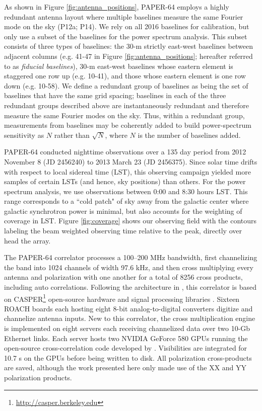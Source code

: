 \documentclass[twocolumn,numberedappendix]{emulateapj} \shorttitle{PSA64}
\begin{document}
As shown in Figure \ref{fig:antenna_positions}, PAPER-64 employs
a highly redundant antenna layout where multiple baselines measure
the same Fourier mode on the sky (P12a; P14).
We rely on all 2016 baselines for calibration,
but only use a subset of the baselines for the power spectrum
analysis. This subset consists of three types of baselines: the 30-m
strictly east-west baselines between adjacent columns (e.g. 41-47
in Figure \ref{fig:antenna_positions}; hereafter referred to 
as {\it fiducial baselines}), 30-m east-west baselines
whose eastern element is staggered one row up (e.g. 10-41), and
those whose eastern element is one row down (e.g. 10-58).
We define a redundant group of
baselines as being the set of baselines that have the same grid spacing;
baselines in each
of the three redundant groups described above are instantaneously redundant and
therefore measure the same Fourier modes on the sky. Thus, within a redundant group,
measurements from baselines may be 
coherently added to build power-spectrum sensitivity as $N$ rather than
$\sqrt{N}$, where $N$ is the number of baselines added.  

PAPER-64 conducted nighttime observations over a 135 day period 
from 2012 November 8 (JD 2456240) to 2013 March 23 (JD 2456375). 
Since solar time drifts with respect to local sidereal time (LST), this observing campaign
yielded more samples of certain LSTs (and hence, sky positions) than others. 
For the power spectrum analysis, we use observations between 0:00 and 8:30 hours
LST.  This range corresponds to
a ``cold patch" of sky away from the galactic center where galactic synchrotron power is minimal,
but also accounts for the weighting of coverage in LST.
Figure \ref{fig:coverage} shows our observing field with the contours labeling
the beam weighted observing time relative to the peak, directly over head the
array.

The PAPER-64 correlator processes a 100--200 MHz bandwidth, first
channelizing the band into 1024 channels of width 97.6 kHz, and then
cross multiplying every antenna and polarization with one another for a total of
8256 cross products, including auto correlations.  Following the architecture 
in \citet{parsons_et_al2008}, this
correlator is based on CASPER\footnote{\url{http://casper.berkeley.edu}} open-source
hardware and signal processing libraries \citep{parsons_et_al2006}.  
Sixteen ROACH boards each hosting eight 8-bit analog-to-digital
converters digitize and channelize antenna inputs. New to this correlator,
the cross multiplication engine is implemented on eight servers each receiving
channelized data over two 10-Gb Ethernet links.  Each server hosts
two NVIDIA GeForce 580 GPUs running the open-source cross-correlation code developed
by \citet{clark_et_al2013}.
Visibilities are integrated for 10.7 s on the GPUs before
being written to disk.  All polarization cross-products are saved, although the
work presented here only made use of the XX and YY polarization products.
\end{document}
